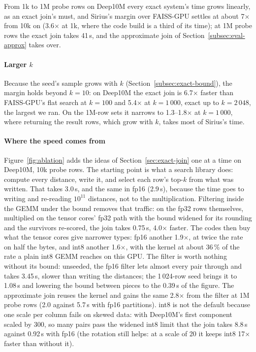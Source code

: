 From 1k to 1M probe rows on Deep10M every exact system's time grows linearly, as an exact join's must, and Sirius's margin over FAISS-GPU settles at about 7$\times$ from 10k on (3.6$\times$ at 1k, where the code build is a third of its time); at 1M probe rows the exact join takes 41\,s, and the approximate join of Section~\ref{subsec:eval-approx} takes over.

\paragraph{Larger $k$}
Because the seed's sample grows with $k$ (Section~\ref{subsec:exact-bound}), the margin holds beyond $k{=}10$: on Deep10M the exact join is 6.7$\times$ faster than FAISS-GPU's flat search at $k{=}100$ and 5.4$\times$ at $k{=}1\,000$, exact up to $k{=}2\,048$, the largest we ran.
On the 1M-row sets it narrows to 1.3--1.8$\times$ at $k{=}1\,000$, where returning the result rows, which grow with $k$, takes most of Sirius's time.

\paragraph{Where the speed comes from}\label{subsec:eval-ablations}



Figure~\ref{fig:ablation} adds the ideas of Section~\ref{sec:exact-join} one at a time on Deep10M, 10k probe rows.
The starting point is what a search library does: compute every distance, write it, and select each row's top-$k$ from what was written.
That takes 3.0\,s, and the same in fp16 (2.9\,s), because the time goes to writing and re-reading $10^{11}$ distances, not to the multiplication.
Filtering inside the GEMM under the bound removes that traffic: on the fp32 rows themselves, multiplied on the tensor cores' fp32 path with the bound widened for its rounding and the survivors re-scored, the join takes 0.75\,s, 4.0$\times$ faster.
The codes then buy what the tensor cores give narrower types: fp16 another 1.9$\times$, at twice the rate on half the bytes, and int8 another 1.6$\times$, with the kernel at about 36\,\% of the rate a plain int8 GEMM reaches on this GPU.
The filter is worth nothing without its bound: unseeded, the fp16 filter lets almost every pair through and takes 3.45\,s, slower than writing the distances; the 1\,024-row seed brings it to 1.08\,s and lowering the bound between pieces to the 0.39\,s of the figure.
The approximate join reuses the kernel and gains the same 2.8$\times$ from the filter at 1M probe rows (2.0 against 5.7\,s with fp16 partitions).
int8 is not the default because one scale per column fails on skewed data: with Deep10M's first component scaled by 300, so many pairs pass the widened int8 limit that the join takes 8.8\,s against 0.92\,s with fp16 (the rotation still helps: at a scale of 20 it keeps int8 17$\times$ faster than without it).

